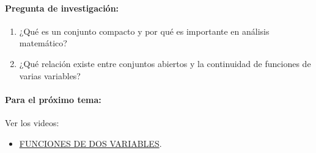 \documentclass[a4,11pt]{aleph-notas}
\begin{document}
\paragraph{Pregunta de investigación:}
\begin{enumerate}[leftmargin=*]
    \item ¿Qué es un conjunto compacto y por qué es importante en análisis matemático?
    \item ¿Qué relación existe entre conjuntos abiertos y la continuidad de funciones de varias variables?
\end{enumerate}

\paragraph{Para el próximo tema:}
Ver los videos:
\begin{itemize}[leftmargin=*]
    \item \href{https://youtu.be/ut_iqneq8EA?si=fpEqc0wVl-2i1P2o}{FUNCIONES DE DOS VARIABLES}.
\end{itemize}
\end{document}

